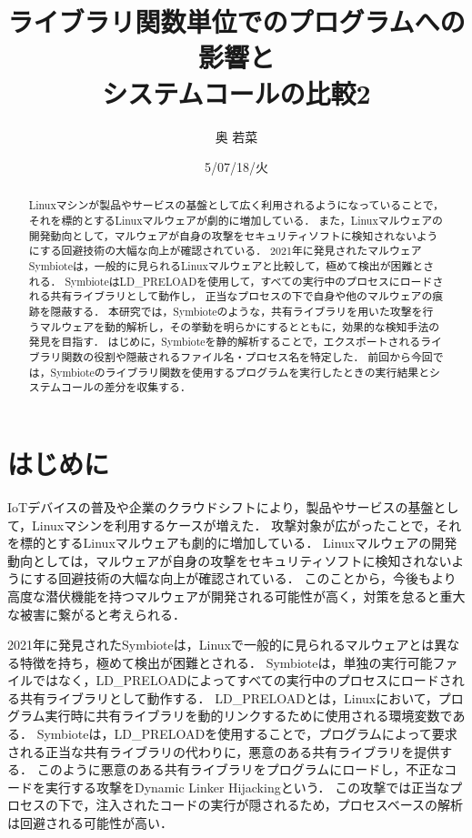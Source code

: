 \documentclass[submit,techreq,noauthor]{eco}	%
\begin{document}
\date   {5/07/18/火}				%
\title  {ライブラリ関数単位でのプログラムへの影響と\\システムコールの比較2}	%
\author {奥 若菜}				%


\begin{abstract}
	Linuxマシンが製品やサービスの基盤として広く利用されるようになっていることで，それを標的とするLinuxマルウェアが劇的に増加している．
  また，Linuxマルウェアの開発動向として，マルウェアが自身の攻撃をセキュリティソフトに検知されないようにする回避技術の大幅な向上が確認されている．
  2021年に発見されたマルウェアSymbioteは，一般的に見られるLinuxマルウェアと比較して，極めて検出が困難とされる．
  SymbioteはLD\_PRELOADを使用して，すべての実行中のプロセスにロードされる共有ライブラリとして動作し，
  正当なプロセスの下で自身や他のマルウェアの痕跡を隠蔽する．
  本研究では，Symbioteのような，共有ライブラリを用いた攻撃を行うマルウェアを動的解析し，その挙動を明らかにするとともに，効果的な検知手法の発見を目指す．
  はじめに，Symbioteを静的解析することで，エクスポートされるライブラリ関数の役割や隠蔽されるファイル名・プロセス名を特定した．
  前回から今回では，Symbioteのライブラリ関数を使用するプログラムを実行したときの実行結果とシステムコールの差分を収集する．
\end{abstract}
\maketitle


\section{はじめに}
IoTデバイスの普及や企業のクラウドシフトにより，製品やサービスの基盤として，Linuxマシンを利用するケースが増えた．
攻撃対象が広がったことで，それを標的とするLinuxマルウェアも劇的に増加している\cite{TREND-MICRO}．
Linuxマルウェアの開発動向としては，マルウェアが自身の攻撃をセキュリティソフトに検知されないようにする回避技術の大幅な向上が確認されている\cite{IBM}．
このことから，今後もより高度な潜伏機能を持つマルウェアが開発される可能性が高く，対策を怠ると重大な被害に繋がると考えられる．


2021年に発見されたSymbioteは，Linuxで一般的に見られるマルウェアとは異なる特徴を持ち，極めて検出が困難とされる\cite{Symbiote}．
Symbioteは，単独の実行可能ファイルではなく，LD\_PRELOADによってすべての実行中のプロセスにロードされる共有ライブラリとして動作する．
LD\_PRELOADとは，Linuxにおいて，プログラム実行時に共有ライブラリを動的リンクするために使用される環境変数である．
Symbioteは，LD\_PRELOADを使用することで，プログラムによって要求される正当な共有ライブラリの代わりに，悪意のある共有ライブラリを提供する．
このように悪意のある共有ライブラリをプログラムにロードし，不正なコードを実行する攻撃をDynamic Linker Hijackingという\cite{MITRE-ATT&CK}．
この攻撃では正当なプロセスの下で，注入されたコードの実行が隠されるため，プロセスベースの解析は回避される可能性が高い．
\end{document}
